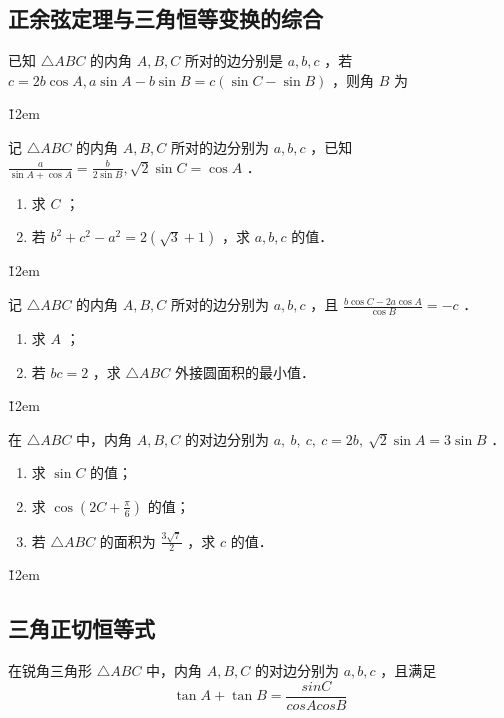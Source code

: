 \subsection{正余弦定理与三角恒等变换的综合}

\begin{example}
    已知 $\triangle A B C$ 的内角 $A, B, C$ 所对的边分别是 $a, b, c$ ，若 $c=2 b \cos A, a \sin A-b \sin B=c(\sin C-\sin B)$ ，则角 $B$ 为
\end{example}
\v{12em}

\begin{example}
    记 $\triangle A B C$ 的内角 $A, B, C$ 所对的边分别为 $a, b, c$ ，已知 $\frac{a}{\sin A+\cos A}=\frac{b}{2 \sin B}, \sqrt{2} \sin C=\cos A$ ．
    \begin{enumerate}
        \item 求 $C$ ；
        \item 若 $b^2+c^2-a^2=2(\sqrt{3}+1)$ ，求 $a, b, c$ 的值．
    \end{enumerate}
\end{example}

\v{12em}

\begin{example}
    记 $\triangle A B C$ 的内角 $A, B, C$ 所对的边分别为 $a, b, c$ ，且 $\frac{b \cos C-2 a \cos A}{\cos B}=-c$ ．
    \begin{enumerate}
        \item 求 $A$ ；
        \item 若 $b c=2$ ，求 $\triangle A B C$ 外接圆面积的最小值．
    \end{enumerate}
\end{example}
\v{12em}

\begin{example}
    在 $\triangle A B C$ 中，内角 $A, B, C$ 的对边分别为 $a, ~ b, ~ c, ~ c=2 b, ~ \sqrt{2} \sin A=3 \sin B$ ．
    \begin{enumerate}
        \item 求 $\sin C$ 的值；
        \item 求 $\cos \left(2 C+\frac{\pi}{6}\right)$ 的值；
        \item 若 $\triangle A B C$ 的面积为 $\frac{3 \sqrt{7}}{2}$ ，求 $c$ 的值．
    \end{enumerate}
\end{example}
\v{12em}

\subsection{三角正切恒等式}
\begin{theorem}[正切相加恒等式]
    在锐角三角形 $\triangle ABC$ 中，内角 $A, B, C$ 的对边分别为 $a, b, c$ ，且满足
    $$
        \tan A + \tan B = \frac{sinC}{cosAcosB}
    $$
\end{theorem}

